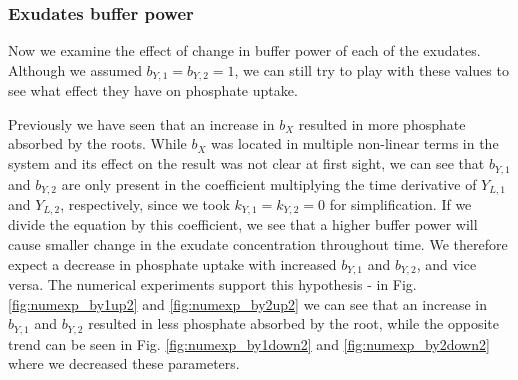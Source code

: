 \documentclass[11pt]{article}
\numberwithin{equation}{section}
\begin{document}
\subsubsection{Exudates buffer power}
Now we examine the effect of change in buffer power of each of the exudates. Although we assumed $b_{Y,1}=b_{Y,2}=1$, we can still try to play with these values to see what effect they have on phosphate uptake. 

Previously we have seen that an increase in $b_X$ resulted in more phosphate absorbed by the roots. While $b_X$ was located in multiple non-linear terms in the system and its effect on the result was not clear at first sight, we can see that $b_{Y,1}$ and $b_{Y,2}$ are only present in the coefficient multiplying the time derivative of $Y_{L,1}$ and $Y_{L,2}$, respectively, since we took $k_{Y,1}=k_{Y,2}=0$ for simplification. If we divide the equation by this coefficient, we see that a higher buffer power will cause smaller change in the exudate concentration throughout time. We therefore expect a decrease in phosphate uptake with increased $b_{Y,1}$ and $b_{Y,2}$, and vice versa. The numerical experiments support this hypothesis - in Fig. \ref{fig:numexp_by1up2} and \ref{fig:numexp_by2up2} we can see that an increase in $b_{Y,1}$ and $b_{Y,2}$ resulted in less phosphate absorbed by the root, while the opposite trend can be seen in Fig. \ref{fig:numexp_by1down2} and \ref{fig:numexp_by2down2} where we decreased these parameters. 
\end{document}
